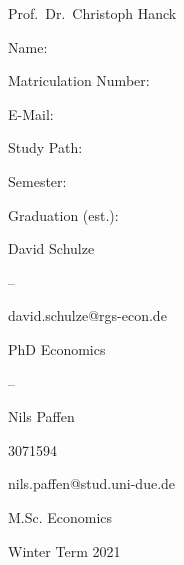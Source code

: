 \documentclass[12pt,a4paper]{article}
\begin{document}
\begin{titlepage}
  \noindent\begin{minipage}[t]{0.3\textwidth}
  \end{minipage}
  \begin{minipage}[t]{0.7\textwidth}
  \hspace{1cm}Prof.~Dr.~Christoph Hanck
  \end{minipage}

  \noindent\begin{minipage}[t]{0.3\textwidth}
  \end{minipage}
  \begin{minipage}[t]{0.7\textwidth}
  \hspace{1cm}
  \end{minipage}

  \hrulefill

  \begin{multicols}{3}

  Name:

  Matriculation Number:

  E-Mail:

  Study Path:

  Semester:

  Graduation (est.):
 
  \columnbreak

  David Schulze

  --
  
  david.schulze@rgs-econ.de

  PhD Economics


  -- 
  
  \columnbreak

  Nils Paffen

  3071594
  
  nils.paffen@stud.uni-due.de

  M.Sc. Economics


  Winter Term 2021

	\end{multicols}

\end{titlepage}



{
\hypersetup{linkcolor=black}

\setcounter{tocdepth}{3}
\tableofcontents
}
\end{document}
